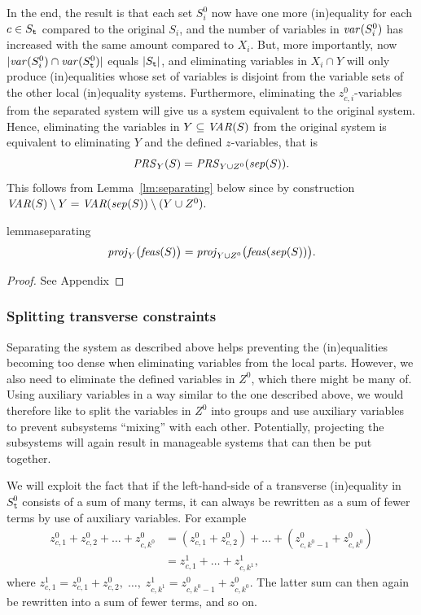 In the end, the result is that each set $S_i^0$ now have one more (in)equality for each $c \in S_{\texttt{t}}$ %
compared to the original $S_i$, and the number of variables in $\mathit{var}(S_i^0)$ has increased with the same amount compared to $X_i$.
But, more importantly, now $|\mathit{var}(S_i^0)\cap \mathit{var}(S^0_{\texttt{t}})|$ equals $|S_{\texttt{t}}|$, and eliminating variables in $X_i\cap Y$ will only produce (in)equalities whose set of variables is disjoint from the variable sets of the other local (in)equality systems.
Furthermore, eliminating the $z^0_{c,i}$-variables from the separated system 
will give us a system equivalent to the original system. 
Hence, eliminating the variables in $Y\subseteq \mathit{VAR}(S)$ from the original system is equivalent to eliminating $Y$ and the defined $z$-variables, that is 
\[
\mathit{PRS}_Y(S) = \mathit{PRS}_{Y\cup Z^0}(\mathit{sep}(S)).
\]
This follows from Lemma~\ref{lm:separating} below since by construction $\mathit{VAR}(S)\setminus Y = \mathit{VAR}(\mathit{sep}(S))\setminus (Y\cup Z^0).$
\begin{restatable}{lemma}{separating}\label{lm:separating}
\[
\mathit{proj}_Y\big(\mathit{feas}(S)\big)=\mathit{proj}_{Y\cup Z^0}\big(\mathit{feas}(\mathit{sep}(S))\big).
\]
\end{restatable}
\begin{proof}
See Appendix
\end{proof}

\subsubsection{Splitting transverse constraints}
Separating the system as described above helps preventing the (in)equalities becoming too dense when eliminating variables from the local parts. However, we also need to eliminate the defined variables in $Z^0$, which there might be many of. Using auxiliary variables in a way similar to the one described above, we would therefore like to split the variables in $Z^0$ into groups and use auxiliary variables to prevent subsystems ``mixing'' with each other. Potentially, projecting the subsystems will again result in manageable systems that can then be put together.

We will exploit the fact that if the left-hand-side of a transverse (in)equality in $S^0_\texttt{t}$ consists of a sum of many terms, it can always be rewritten as a sum of fewer terms by use of auxiliary variables. For example
\begin{align*}
z^0_{c,1} + z^0_{c,2} + \ldots + z^0_{c,k^0} &=
(z^0_{c,1} + z^0_{c,2}) + \ldots + (z^0_{c,k^0-1} + z^0_{c, k^0}) \\
&= z^1_{c,1} + \ldots + z^1_{c,k^1},
\end{align*}
where $z^1_{c,1} = z^0_{c,1} + z^0_{c,2},\; \ldots,\; z^1_{c,k^1}=z^0_{c,k^0-1} + z^0_{c,k^0}$. The latter sum can then again be rewritten into a sum of fewer terms, and so on.

